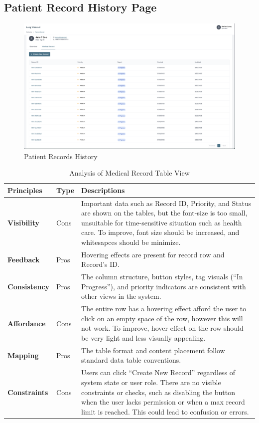 \documentclass[12pt, titlepage]{article}
\begin{document}
\newpage
\subsection{Patient Record History Page}
  \begin{figure}[ht!] 
    \centering
    \includegraphics[scale=0.25]{../assets/patient_records.png}
    \caption{Patient Records History}
    \label{fig:patient_records}
  \end{figure}

\begin{table}[h!]
    \centering
    \begin{tabular}{|p{2.5cm}|p{1.5cm}|p{11cm}|}
    \hline
    \rowcolor{gray!30}
    \textbf{Principles} & \textbf{Type} & \textbf{Descriptions} \\
    \hline
    \textbf{Visibility} & Cons & Important data such as Record ID, Priority, and Status are shown on the tables, but the font-size is too small, unsuitable for time-sensitive situation such as health care. To improve, font size should be increased, and whitesapces should be minimize. \\
    \hline
    \textbf{Feedback} & Pros & Hovering effects are present for record row and Record's ID.\\
    \hline
    \textbf{Consistency} & Pros & The column structure, button styles, tag visuals (“In Progress”), and priority indicators are consistent with other views in the system. \\
    \hline
    \textbf{Affordance} & Cons & The entire row has a hovering effect afford the user to click on an empty space of the row, however this will not work. To improve, hover effect on the row should be very light and less visually appealing. \\
    \hline
    \textbf{Mapping} & Pros & The table format and content placement follow standard data table conventions. \\
    \hline
    \textbf{Constraints} & Cons & Users can click “Create New Record” regardless of system state or user role. There are no visible constraints or checks, such as disabling the button when the user lacks permission or when a max record limit is reached. This could lead to confusion or errors. \\
    \hline
    \end{tabular}
    \caption{Analysis of Medical Record Table View}
\end{table}
\end{document}
